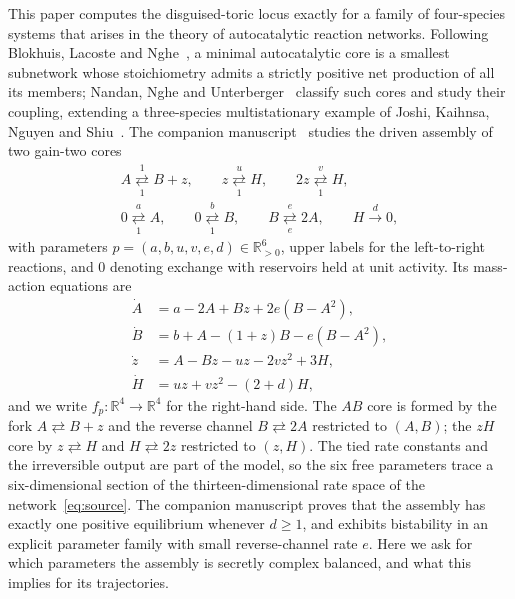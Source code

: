 \documentclass[11pt,a4paper]{article}
\theoremstyle{plain}
\theoremstyle{definition}
\theoremstyle{remark}
\newcommand{\R}{\mathbb{R}}
\newcommand{\Rp}{\R_{>0}}
\newcommand{\rev}[2]{\mathrel{\mathop{\rightleftarrows}\limits^{#1}_{#2}}}
\begin{document}
This paper computes the disguised-toric locus exactly for a family of four-species systems that arises in the theory of autocatalytic reaction networks. Following Blokhuis, Lacoste and Nghe~\cite{BlokhuisLacosteNghe2020}, a minimal autocatalytic core is a smallest subnetwork whose stoichiometry admits a strictly positive net production of all its members; Nandan, Nghe and Unterberger~\cite{NandanNgheUnterberger2026} classify such cores and study their coupling, extending a three-species multistationary example of Joshi, Kaihnsa, Nguyen and Shiu~\cite{JoshiKaihnsaNguyenShiu2023}. The companion manuscript~\cite{FeedbackBistability2026} studies the driven assembly of two gain-two cores
\begin{equation}\label{eq:source}
\begin{gathered}
A\rev{1}{1}B+z,\qquad z\rev{u}{1}H,\qquad 2z\rev{v}{1}H,\\
0\rev{a}{1}A,\qquad 0\rev{b}{1}B,\qquad B\rev{e}{e}2A,\qquad H\xrightarrow{\ d\ }0,
\end{gathered}
\end{equation}
with parameters $p=(a,b,u,v,e,d)\in\Rp^6$, upper labels for the left-to-right reactions, and $0$ denoting exchange with reservoirs held at unit activity. Its mass-action equations are
\begin{equation}\label{eq:ode}
\begin{aligned}
\dot A&=a-2A+Bz+2e(B-A^2),\\
\dot B&=b+A-(1+z)B-e(B-A^2),\\
\dot z&=A-Bz-uz-2vz^2+3H,\\
\dot H&=uz+vz^2-(2+d)H,
\end{aligned}
\end{equation}
and we write $f_p:\R^4\to\R^4$ for the right-hand side. The $AB$ core is formed by the fork $A\rightleftarrows B+z$ and the reverse channel $B\rightleftarrows2A$ restricted to $(A,B)$; the $zH$ core by $z\rightleftarrows H$ and $H\rightleftarrows2z$ restricted to $(z,H)$. The tied rate constants and the irreversible output are part of the model, so the six free parameters trace a six-dimensional section of the thirteen-dimensional rate space of the network~\eqref{eq:source}. The companion manuscript proves that the assembly has exactly one positive equilibrium whenever $d\ge1$, and exhibits bistability in an explicit parameter family with small reverse-channel rate $e$. Here we ask for which parameters the assembly is secretly complex balanced, and what this implies for its trajectories.
\end{document}
